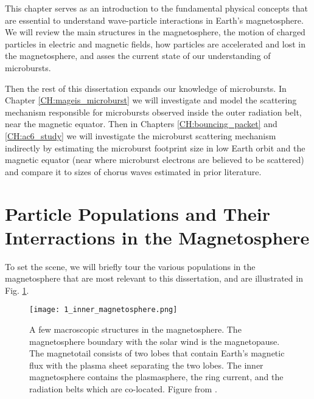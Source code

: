 This chapter serves as an introduction to the fundamental physical concepts that are essential to understand wave-particle interactions in Earth's magnetosphere. We will review the main structures in the magnetosphere, the motion of charged particles in electric and magnetic fields, how particles are accelerated and lost in the magnetosphere, and asses the current state of our understanding of microbursts.

Then the rest of this dissertation expands our knowledge of microbursts. In Chapter \ref{CH:mageis_microburst} we will investigate and model the scattering mechanism responsible for microbursts observed inside the outer radiation belt, near the magnetic equator. Then in Chapters \ref{CH:bouncing_packet} and \ref{CH:ac6_study} we will investigate the microburst scattering mechanism indirectly by estimating the microburst footprint size in low Earth orbit and the magnetic equator (near where microburst electrons are believed to be scattered) and compare it to sizes of chorus waves estimated in prior literature.

\section{Particle Populations and Their Interractions in the Magnetosphere}\label{ntro:particle_populations}
To set the scene, we will briefly tour the various populations in the magnetosphere that are most relevant to this dissertation, and are illustrated in Fig. \ref{Intro:inner_magnetosphere}.

\begin{figure}
\texttt{[image: 1\_inner\_magnetosphere.png]}
\caption{A few macroscopic structures in the magnetosphere. The magnetosphere boundary with the solar wind is the magnetopause. The magnetotail consists of two lobes that contain Earth's magnetic flux with the plasma sheet separating the two lobes. The inner magnetosphere contains the plasmasphere, the ring current, and the radiation belts which are co-located. Figure from \citet{Baumjohann1997}.}
\label{Intro:inner_magnetosphere}
\end{figure}

